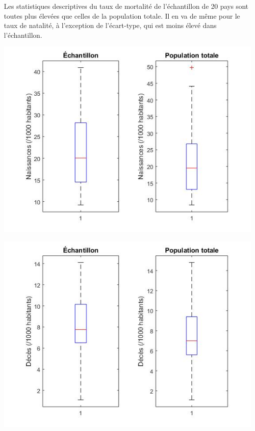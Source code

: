 \documentclass[a4paper,10pt]{article}
\begin{document}
Les statistiques descriptives du taux de mortalité de l'échantillon de 20 pays sont toutes plus élevées que celles de la population totale. Il en va de même pour le taux de natalité, à l'exception de l'écart-type, qui est moins élevé dans l'échantillon.


\begin{center}
	\includegraphics[scale=0.5]{Figure5.jpg}
\end{center}


\begin{center}
	\includegraphics[scale=0.5]{Figure6.jpg}
\end{center}
\end{document}
